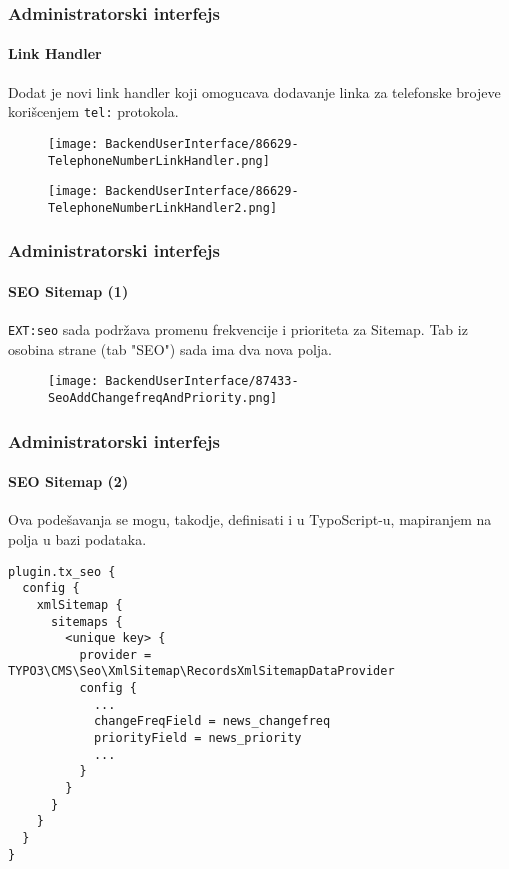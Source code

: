 
\begin{frame}[fragile]
	\frametitle{Administratorski interfejs}
	\framesubtitle{Link Handler}

	Dodat je novi link handler koji omogucava dodavanje linka za telefonske brojeve
	korišcenjem \texttt{tel:} protokola.

	\begin{figure}
		\texttt{[image: BackendUserInterface/86629-TelephoneNumberLinkHandler.png]}
	\end{figure}

	\begin{figure}
		\texttt{[image: BackendUserInterface/86629-TelephoneNumberLinkHandler2.png]}
	\end{figure}

\end{frame}


\begin{frame}[fragile]
	\frametitle{Administratorski interfejs}
	\framesubtitle{SEO Sitemap (1)}

	\texttt{EXT:seo} sada podržava promenu frekvencije i prioriteta za Sitemap.
	Tab iz osobina strane (tab "SEO") sada ima dva nova polja.

	\begin{figure}
		\texttt{[image: BackendUserInterface/87433-SeoAddChangefreqAndPriority.png]}
	\end{figure}

\end{frame}


\begin{frame}[fragile]
	\frametitle{Administratorski interfejs}
	\framesubtitle{SEO Sitemap (2)}

	\lstset{basicstyle=\tiny\ttfamily}

  Ova podešavanja se mogu, takodje, definisati i u TypoScript-u, mapiranjem na polja
	u bazi podataka.

	\begin{lstlisting}
plugin.tx_seo {
  config {
    xmlSitemap {
      sitemaps {
        <unique key> {
          provider = TYPO3\CMS\Seo\XmlSitemap\RecordsXmlSitemapDataProvider
          config {
            ...
            changeFreqField = news_changefreq
            priorityField = news_priority
            ...
          }
        }
      }
    }
  }
}
	\end{lstlisting}

\end{frame}

